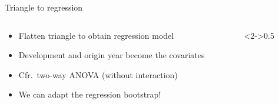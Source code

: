 \documentclass[tikz]{beamer}
\begin{document}
\begin{frame}{Triangle to regression}
    \begin{columns}
        \begin{column}{0.5\linewidth}
            \begin{itemize}
                \item Flatten triangle to obtain regression model
                \item Development and origin year become the covariates
                \item Cfr.\ two-way ANOVA (without interaction)
                \item We can adapt the regression bootstrap!
            \end{itemize}
        \end{column}
        \begin{column}<2->{0.5\linewidth}
            \centering
        \end{column}
    \end{columns}
\end{frame}
\end{document}
